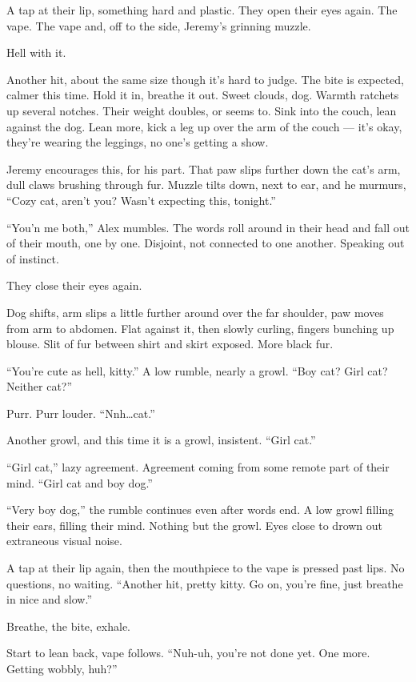 \documentclass[12pt,letterpaper,oneside]{memoir}
\begin{document}
  A tap at their lip, something hard and plastic. They open their eyes
  again. The vape. The vape and, off to the side, Jeremy's grinning
  muzzle.

  Hell with it.

  Another hit, about the same size though it's hard to judge. The bite is
  expected, calmer this time. Hold it in, breathe it out. Sweet clouds,
  dog. Warmth ratchets up several notches. Their weight doubles, or seems
  to. Sink into the couch, lean against the dog. Lean more, kick a leg up
  over the arm of the couch --- it's okay, they're wearing the leggings,
  no one's getting a show.

  Jeremy encourages this, for his part. That paw slips further down the
  cat's arm, dull claws brushing through fur. Muzzle tilts down, next to
  ear, and he murmurs, ``Cozy cat, aren't you? Wasn't expecting this,
  tonight.''

  ``You'n me both,'' Alex mumbles. The words roll around in their head and
  fall out of their mouth, one by one. Disjoint, not connected to one
  another. Speaking out of instinct.

  They close their eyes again.

  Dog shifts, arm slips a little further around over the far shoulder, paw
  moves from arm to abdomen. Flat against it, then slowly curling, fingers
  bunching up blouse. Slit of fur between shirt and skirt exposed. More
  black fur.

  ``You're cute as hell, kitty.'' A low rumble, nearly a growl. ``Boy cat?
  Girl cat? Neither cat?''

  Purr. Purr louder. ``Nnh\ldots{}cat.''

  Another growl, and this time it is a growl, insistent. ``Girl cat.''

  ``Girl cat,'' lazy agreement. Agreement coming from some remote part of
  their mind. ``Girl cat and boy dog.''

  ``Very boy dog,'' the rumble continues even after words end. A low growl
  filling their ears, filling their mind. Nothing but the growl. Eyes
  close to drown out extraneous visual noise.

  A tap at their lip again, then the mouthpiece to the vape is pressed
  past lips. No questions, no waiting. ``Another hit, pretty kitty. Go on,
  you're fine, just breathe in nice and slow.''

  Breathe, the bite, exhale.

  Start to lean back, vape follows. ``Nuh-uh, you're not done yet. One
  more. Getting wobbly, huh?''
\end{document}
